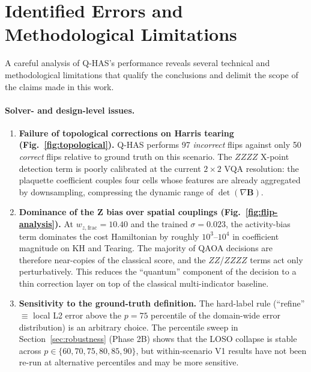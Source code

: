 \documentclass[12pt, a4paper, oneside]{report}
\begin{document}
\section{Identified Errors and Methodological Limitations}
\label{sec:identified-errors}

A careful analysis of Q-HAS's performance reveals several technical and methodological limitations that qualify the conclusions and delimit the scope of the claims made in this work.

\paragraph{Solver- and design-level issues.}
\begin{enumerate}
    \item \textbf{Failure of topological corrections on Harris tearing (Fig.~\ref{fig:topological}).} Q-HAS performs 97 \textit{incorrect} flips against only 50 \textit{correct} flips relative to ground truth on this scenario. The $ZZZZ$ X-point detection term is poorly calibrated at the current $2 \times 2$ VQA resolution: the plaquette coefficient couples four cells whose features are already aggregated by downsampling, compressing the dynamic range of $\det(\nabla \mathbf{B})$.
    \item \textbf{Dominance of the Z bias over spatial couplings (Fig.~\ref{fig:flip-analysis}).} At $w_{z,\text{frac}} = 10.40$ and the trained $\sigma = 0.023$, the activity-bias term dominates the cost Hamiltonian by roughly $10^3$--$10^4$ in coefficient magnitude on KH and Tearing. The majority of QAOA decisions are therefore near-copies of the classical score, and the $ZZ$/$ZZZZ$ terms act only perturbatively. This reduces the ``quantum'' component of the decision to a thin correction layer on top of the classical multi-indicator baseline.
    \item \textbf{Sensitivity to the ground-truth definition.} The hard-label rule (``refine'' $\equiv$ local L2 error above the $p = 75$ percentile of the domain-wide error distribution) is an arbitrary choice. The percentile sweep in Section~\ref{sec:robustness} (Phase 2B) shows that the LOSO collapse is stable across $p \in \{60, 70, 75, 80, 85, 90\}$, but within-scenario V1 results have not been re-run at alternative percentiles and may be more sensitive.
\end{enumerate}
\end{document}

